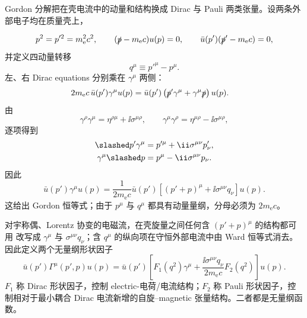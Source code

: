 \begin{derivation}
Gordon 分解把在壳电流中的动量和结构换成 Dirac 与 Pauli 两类张量。设两条外部电子均在质量壳上，

\begin{equation*}
 p^2=p'^2=m_{\mathrm e}^2c^2,
 \qquad
 (\slashed p-m_{\mathrm e} c)u(p)=0,
 \qquad
 \bar u(p')(\slashed p'-m_{\mathrm e} c)=0,
\end{equation*}
并定义四动量转移
\begin{equation*}
 q^\mu\equiv p'^\mu-p^\mu.
\end{equation*}
左、右 Dirac equations 分别乘在 $\gamma^\mu$ 两侧：
\begin{align*}
 2m_{\mathrm e} c\,\bar u(p')\gamma^\mu u(p)
 &=\bar u(p')\left(\slashed p'\gamma^\mu+\gamma^\mu\slashed p\right)u(p).
\end{align*}
由
\begin{equation*}
 \gamma^\rho\gamma^\mu
 =\eta^{\rho\mu}+\ii\sigma^{\mu\rho},
 \qquad
 \gamma^\mu\gamma^\rho
 =\eta^{\mu\rho}-\ii\sigma^{\mu\rho},
\end{equation*}
逐项得到
\begin{align*}
 \slashed p'\gamma^\mu
 &=p'^\mu+\ii\sigma^{\mu\nu}p'_\nu,\\
 \gamma^\mu\slashed p
 &=p^\mu-\ii\sigma^{\mu\nu}p_\nu.
\end{align*}
因此
\begin{equation*}
 {
 \bar u(p')\gamma^\mu u(p)
 =\frac1{2m_{\mathrm e} c}\bar u(p')
 \left[(p'+p)^\mu+\ii\sigma^{\mu\nu}q_\nu\right]u(p).}
 \end{equation*}
这给出 Gordon 恒等式；由于 $p^\mu$ 与 $q^\mu$ 都具有动量量纲，分母必须为 $2m_{\mathrm e} c$。

对宇称偶、Lorentz 协变的电磁流，在壳旋量之间任何含 $(p'+p)^\mu$ 的结构都可用  改写成 $\gamma^\mu$ 与 $\sigma^{\mu\nu}q_\nu$；含 $q^\mu$ 的纵向项在守恒外部电流中由 Ward 恒等式消去。因此定义两个无量纲形状因子
\begin{equation*}
 {
 \bar u(p')\Gamma^\mu(p',p)u(p)
 =\bar u(p')\left[
 F_1(q^2)\gamma^\mu
 +\frac{\ii\sigma^{\mu\nu}q_\nu}{2m_{\mathrm e} c}F_2(q^2)
 \right]u(p).}
 \end{equation*}
$F_1$ 称 Dirac 形状因子，控制 electric-电荷/电流结构；$F_2$ 称 Pauli 形状因子，控制相对于最小耦合 Dirac 电流新增的自旋--magnetic 张量结构。二者都是无量纲函数。
\end{derivation}


